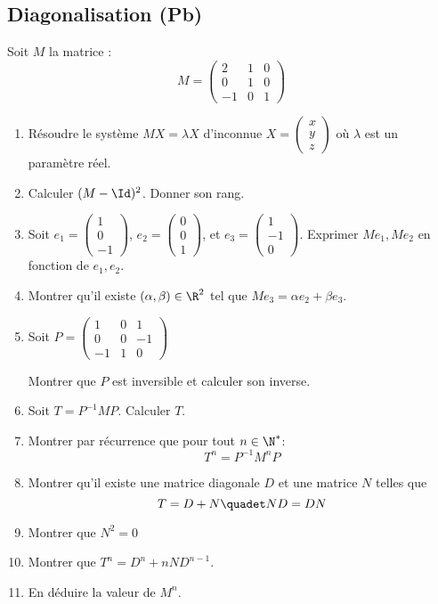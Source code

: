 \subsection{Diagonalisation (Pb)}
\begin{exercice}
Soit $M$ la matrice : 
$$M=\left( \begin{array}{ccc}
2 &1& 0\\
0 &1 & 0  \\
 -1&0&1
\end{array}\right) $$

\begin{enumerate}
\item  Résoudre le système $MX=\lambda X$ d'inconnue $X =\left(
\begin{array}{c}
x\\
y\\
z
\end{array}
 \right)$ où $\lambda$ est un paramètre réel. 
\item Calculer $(M- \Id)^2$. Donner son rang.

 \item Soit $e_1= \left(
\begin{array}{c}
1\\
0\\
-1
\end{array}
 \right)$,  $e_2= \left(
\begin{array}{c}
0\\
0\\
1
\end{array}
 \right)$, et  $e_3= \left(
\begin{array}{c}
1\\
-1\\
0
\end{array}
 \right)$.
Exprimer  $Me_1, Me_2$ en fonction de $e_1, e_2$.
\item Montrer qu'il existe $(\alpha, \beta)\in \R^2$ tel que $M e_3 = \alpha e_2 +\beta e_3$.
 
\item Soit $P= \left(
\begin{array}{ccc}
1&0&1\\
0&0&-1\\
-1&1&0
\end{array}
 \right)$ 
 
 Montrer que $P$ est inversible et calculer son inverse. 
 \item Soit $T=P^{-1}MP$. Calculer $T$. 
 \item Montrer par récurrence que pour tout $n\in \N^*$: 
 $$T^n = P^{-1}M^n P$$
 \item Montrer qu'il existe une matrice diagonale $D$ et une matrice $N$ telles que 
 $$T =D+N \quadet ND=DN$$
\item Montrer que $N^2=0$
\item Montrer   que $T^n = D^n +nND^{n-1}$.
\item En déduire la valeur de $M^n$.
\end{enumerate}
\end{exercice}
